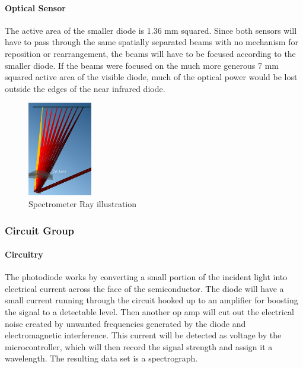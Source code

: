 \paragraph{Optical Sensor} The active area of the smaller diode is 1.36 mm squared. Since both sensors will have to pass through the same spatially separated beams with no mechanism for reposition or rearrangement, the beams will have to be focused according to the smaller diode. If the beams were focused on the much more generous 7 mm squared active area of the visible diode, much of the optical power would be lost outside the edges of the near infrared diode.

\begin{figure}[H]
    \caption{Spectrometer Ray illustration}
    \centering
    \includegraphics[width=0.25\textwidth]{images/YuanCaoSpectrometer.png}
\end{figure}

\subsubsection{Circuit Group}

\paragraph{Circuitry} The photodiode works by converting a small portion of the incident light into electrical current across the face of the semiconductor. The diode will have a small current running through the circuit hooked up to an amplifier for boosting the signal to a detectable level. Then another op amp will cut out the electrical noise created by unwanted frequencies generated by the diode and electromagnetic interference. This current will be detected as voltage by the microcontroller, which will then record the signal strength and assign it a wavelength. The resulting data set is a spectrograph.

